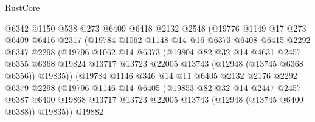 \begin{lexlean}{RustCore}
\begin{coremodule}
                      @6342
                      @1150
                      @538
                      @273
                      @6409
                      @6418
                      @2132
                      @2548
                      (@19776
                        @1149
                        @17
                        @273
                        @6409
                        @6416
                        @2317
                        (@19784
                          @1062
                          @1148
                          @14
                          @16
                          @6373
                          @6408
                          @6415
                          @2292
                          @6347
                          @2298
                          (@19796
                            @1062
                            @14
                            @6373
                            (@19804
                              @82
                              @32
                              @14
                              @4631
                              @2457
                              @6355
                              @6368
                              @19824
                              @13717
                              @13723
                              @22005
                              @13743
                              (@12948 (@13745 @6368 @6356))
                              @19835))
                          (@19784
                            @1146
                            @346
                            @14
                            @11
                            @6405
                            @2132
                            @2176
                            @2292
                            @6379
                            @2298
                            (@19796
                              @1146
                              @14
                              @6405
                              (@19853
                                @82
                                @32
                                @14
                                @2447
                                @2457
                                @6387
                                @6400
                                @19868
                                @13717
                                @13723
                                @22005
                                @13743
                                (@12948 (@13745 @6400 @6388))
                                @19835))
                            @19882

\end{coremodule}
\end{lexlean}
